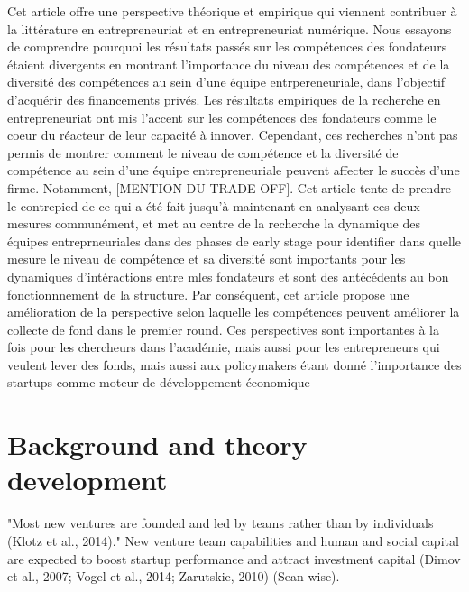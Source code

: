 \documentclass[11pt]{article}
\begin{document}
Cet article offre une perspective théorique et empirique qui viennent contribuer à la littérature en entrepreneuriat et en entrepreneuriat numérique. Nous essayons de comprendre pourquoi les résultats passés sur les compétences des fondateurs étaient divergents en montrant l'importance du niveau des compétences et de la diversité des compétences au sein d'une équipe entrpereneuriale, dans l'objectif d'acquérir des financements privés. Les résultats empiriques de la recherche en entrepreneuriat ont mis l'accent sur les compétences des fondateurs comme le coeur du réacteur de leur capacité à innover. Cependant, ces recherches n'ont pas permis de montrer comment le niveau de compétence et la diversité de compétence au sein d'une équipe entrepreneuriale peuvent affecter le succès d'une firme. Notamment, [MENTION DU TRADE OFF]. Cet article tente de prendre le contrepied de ce qui a été fait jusqu'à maintenant en analysant ces deux mesures communément, et met au centre de la recherche la dynamique des équipes entreprneuriales dans des phases de early stage pour identifier dans quelle mesure le niveau de compétence et sa diversité sont importants pour les dynamiques d'intéractions entre mles fondateurs et sont des antécédents au bon fonctionnnement de la structure. Par conséquent, cet article propose une amélioration de la perspective selon laquelle les compétences peuvent améliorer la collecte de fond dans le premier round. Ces perspectives sont importantes à la fois pour les chercheurs dans l'académie, mais aussi pour les entrepreneurs qui veulent lever des fonds, mais aussi aux policymakers étant donné l'importance des startups comme moteur de développement économique

\section{Background and theory development}

"Most new ventures are founded and led by teams rather than by individuals (Klotz et al., 2014)." New venture team capabilities and human and social capital are expected to boost startup performance and attract investment capital (Dimov et al., 2007; Vogel et al., 2014; Zarutskie, 2010) (Sean wise).
\end{document}
